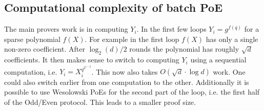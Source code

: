 \documentclass[12pt]{article}
\begin{document}
\subsection{Computational complexity of batch PoE}
The main provers work is in computing $Y_i$. In the first few loops $Y_i=g^{f(q)}$ for a sparse polynomial $f(X)$. For example in the first loop $f(X)$ has only a single non-zero coefficient.
After $\log_2(d)/2$ rounds the polynomial has roughly $\sqrt{d}$ coefficients. It then makes sense to switch to computing $Y_i$ using a sequential computation, i.e. $Y_i=X_i^{q^{2^{i-2}}}$. This now also takes $O(\sqrt{d}\cdot \log{d})$ work. One could also switch earlier from one computation to the other. Additionally it is possible to use Wesolowski PoEs for the second part of the loop, i.e. the first half of the Odd/Even protocol. This leads to a smaller proof size.
\end{document}
